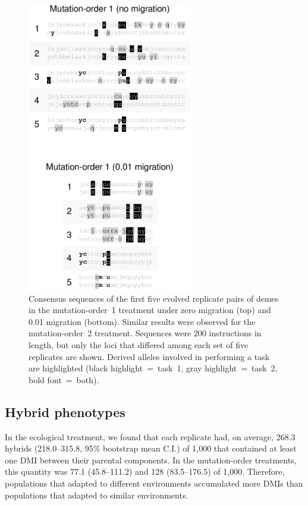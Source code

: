 \begin{doublespace}
\begin{figure}
\centering
\includegraphics[height=5in]{task-muts.pdf}
\caption{Consensus sequences of the first five evolved replicate pairs of demes
  in the mutation-order~1 treatment under zero migration (top)
  and 0.01 migration (bottom).
  Similar results were observed for the mu\-ta\-tion-order~2 treatment.
  Sequences were 200 instructions in length,
  but only the loci that differed among
  each set of five replicates are shown.
  Derived alleles involved in performing a task are highlighted
  (black highlight~=~task~1, gray highlight~=~task~2, bold font~=~both).}
\label{task_muts}
\end{figure}



\subsection{Hybrid phenotypes}

In the ecological treatment,
we found that each replicate had, on average,
268.3 hybrids (218.0--315.8, 95\% bootstrap mean C.I.) of 1,000
that contained at least one DMI between their parental components.
%
In the mutation-order treatments,
this quantity was 77.1 (45.8--111.2) and 128 (83.5--176.5) of 1,000.
%
Therefore, populations that adapted to different environments
accumulated more DMIs than populations that adapted to similar environments.




\end{doublespace}
